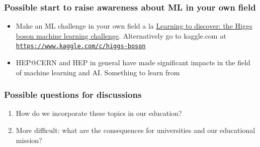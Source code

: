 \documentclass{beamer}
\begin{document}
\begin{frame}
\frametitle{Possible start to raise awareness about ML in your own field}

\begin{block}{}
\begin{itemize}
\item Make an ML challenge in your own field a la \href{{https://home.cern/news/news/computing/higgs-boson-machine-learning-challenge}}{Learning to discover: the Higgs boson machine learning challenge}. Alternatively go to kaggle.com at \href{{https://www.kaggle.com/c/higgs-boson}}{\nolinkurl{https://www.kaggle.com/c/higgs-boson}}

\item HEP@CERN and HEP in general have made significant impacts in the field of machine learning and AI. Something to learn from
\end{itemize}

\noindent
\end{block}
\end{frame}

\begin{frame}
\frametitle{Possible questions for discussions}

\begin{enumerate}
\item How do we incorporate these topics in our education?

\item More difficult: what are the consequences for universities and our educational mission?
\end{enumerate}

\noindent
\end{frame}
\end{document}
